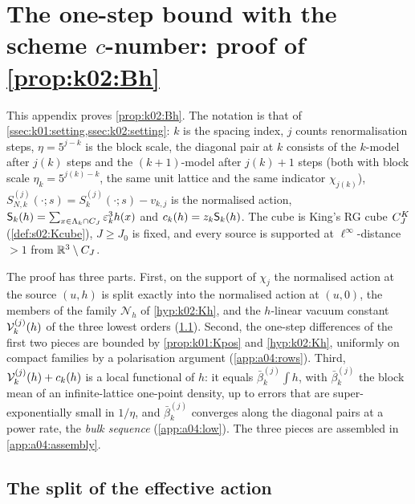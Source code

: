 \providecommand{\dP}{\,\tfrac{dP}{(2\pi)^3}}
\providecommand{\fl}{\mathrm{fl}}
\providecommand{\Bh}{\ensuremath{(\mathrm{B}^{h})}}
\providecommand{\Kh}{\ensuremath{(\mathrm{K}_{h})}}
\providecommand{\Kpos}{\ensuremath{(\mathrm{K}\text{-}\mathrm{pos})_{N}}}

\section{The one-step bound with the scheme \texorpdfstring{$c$}{c}-number: proof of \texorpdfstring{\cref{prop:k02:Bh}}{Proposition (B\^h)}}\label{app:a04_Bh}

This appendix proves \cref{prop:k02:Bh}. The notation is that of \cref{ssec:k01:setting,ssec:k02:setting}: $k$ is the spacing index, $j$ counts renormalisation steps, $\eta=5^{j-k}$ is the block scale, the diagonal pair at $k$ consists of the $k$-model after $j(k)$ steps and the $(k+1)$-model after $j(k)+1$ steps (both with block scale $\eta_k=5^{j(k)-k}$, the same unit lattice and the same indicator $\chi_{j(k)}$), $S^{(j)}_{N,k}(\cdot;s)=S^{(j)}_k(\cdot;s)-v_{k,j}$ is the normalised action, $\mathsf S_k(h)=\sum_{x\in\Lambda_k\cap C_J}\varepsilon_k^3h(x)$ and $c_k(h)=z_k\mathsf S_k(h)$. The cube is King's RG cube $C^{K}_{J}$ (\cref{def:s02:Kcube}), $J\ge J_0$ is fixed, and every source is supported at $\ell^\infty$-distance $>1$ from $\mathbb R^3\setminus C_J$.

The proof has three parts. First, on the support of $\chi_j$ the normalised action at the source $(u,h)$ is split exactly into the normalised action at $(u,0)$, the members of the family $\mathcal N_h$ of \cref{hyp:k02:Kh}, and the $h$-linear vacuum constant $\mathcal V^{(j)}_k(h)$ of the three lowest orders (\cref{app:a04:split}). Second, the one-step differences of the first two pieces are bounded by \cref{prop:k01:Kpos} and \cref{hyp:k02:Kh}, uniformly on compact families by a polarisation argument (\cref{app:a04:rows}). Third, $\mathcal V^{(j)}_k(h)+c_k(h)$ is a local functional of $h$: it equals $\bar\beta^{(j)}_k\int h$, with $\bar\beta^{(j)}_k$ the block mean of an infinite-lattice one-point density, up to errors that are super-exponentially small in $1/\eta$, and $\bar\beta^{(j)}_k$ converges along the diagonal pairs at a power rate, the \emph{bulk sequence} (\cref{app:a04:low}). The three pieces are assembled in \cref{app:a04:assembly}.

\subsection{The split of the effective action}\label{app:a04:split}

